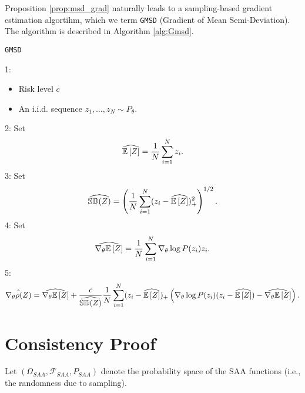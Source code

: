 Proposition \ref{prop:msd_grad} naturally leads to a sampling-based gradient estimation algortihm, which we term \texttt{GMSD} (Gradient of Mean Semi-Deviation). The algorithm is described in Algorithm \ref{alg:Gmsd}.

\begin{algorithm}
\caption{\texttt{GMSD}}\label{alg:Gmsd}
1: \alggiven
\begin{itemize}
\item Risk level $c$
\item An i.i.d. sequence $z_{1},\dots,z_{N} \sim P_\theta$.
\end{itemize}
2: Set
\begin{equation*}
    \widehat{\mathbb{E}\left[ Z \right]} = \frac{1}{N}\sum_{i=1}^{N} z_i.
\end{equation*}
3: Set
\begin{equation*}
    \widehat{\mathbb{SD}(Z)} = \left( \frac{1}{N}\sum_{i=1}^{N} ( z_i - \widehat{\mathbb{E}\left[ Z \right]} )_{+}^{2} \right)^{1 / 2}.
\end{equation*}
4: Set
\begin{equation*}
    \widehat{\nabla_{\theta}{\mathbb{E}\left[ Z \right]}} = \frac{1}{N}\sum_{i=1}^{N} \nabla_{\theta} \log P(z_i) z_i.
\end{equation*}
5: \algreturn
\begin{equation*}
    \hat{\nabla_{\theta}{\rho(Z)}} = \widehat{\nabla_{\theta}{\mathbb{E}\left[ Z \right]}} + \frac{c}{\widehat{\mathbb{SD}(Z)}}\frac{1}{N}\sum_{i=1}^{N} (z_i - \widehat{\mathbb{E}\left[ Z \right]})_{+} \left(\nabla_{\theta} \log P(z_i) (z_i - \widehat{\mathbb{E}\left[ Z \right]}) - \widehat{\nabla_{\theta}{\mathbb{E}\left[ Z \right]}}\right).
\end{equation*}
\end{algorithm}



\section{Consistency Proof}

Let $\left( \Omega_{SAA},\mathcal F_{SAA},P_{SAA} \right)$ denote the probability space of the SAA functions (i.e., the randomness due to sampling).

